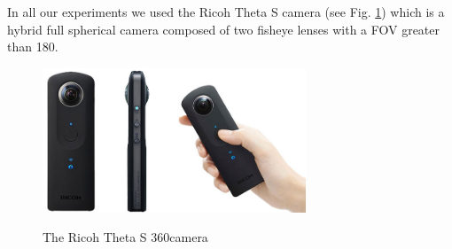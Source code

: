 In all our experiments we used the Ricoh Theta S camera 
(see Fig. \ref{fig:ricoh_theta}) which is a hybrid full spherical camera 
composed of two fisheye lenses with a FOV greater than 180\degree.
\begin{figure}
\centering
\includegraphics[width=0.7\textwidth]{img/theta_s}
\label{fig:ricoh_theta}
\caption{The Ricoh Theta S 360\degree camera}
\end{figure}

